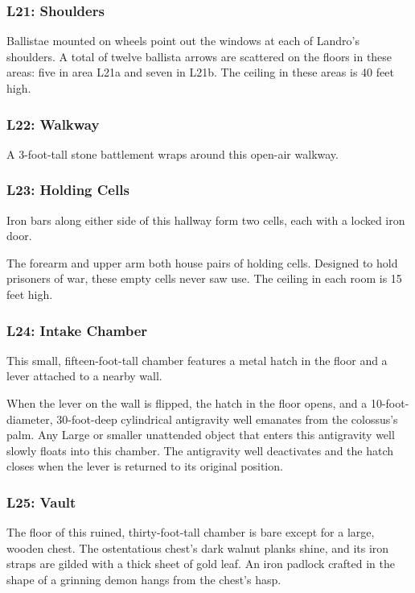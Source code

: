 \documentclass[10pt,a4paper,twoside,bg=print,twocolumn,openany,nodeprecatedcode]{dndbook}
\begin{document}
\subsubsection{L21: Shoulders}
Ballistae mounted on wheels point out the windows at each of Landro's shoulders. A total of twelve ballista arrows are scattered on the floors in these areas: five in area L21a and seven in L21b. The ceiling in these areas is 40 feet high.

\subsubsection{L22: Walkway}
A 3-foot-tall stone battlement wraps around this open-air walkway.

\subsubsection{L23: Holding Cells}
\begin{DndReadAloud}{}
Iron bars along either side of this hallway form two cells, each with a locked iron door.

\end{DndReadAloud}

The forearm and upper arm both house pairs of holding cells. Designed to hold prisoners of war, these empty cells never saw use. The ceiling in each room is 15 feet high.

\subsubsection{L24: Intake Chamber}
\begin{DndReadAloud}{}
This small, fifteen-foot-tall chamber features a metal hatch in the floor and a lever attached to a nearby wall.

\end{DndReadAloud}

When the lever on the wall is flipped, the hatch in the floor opens, and a 10-foot-diameter, 30-foot-deep cylindrical antigravity well emanates from the colossus's palm. Any Large or smaller unattended object that enters this antigravity well slowly floats into this chamber. The antigravity well deactivates and the hatch closes when the lever is returned to its original position.

\subsubsection{L25: Vault}
\begin{DndReadAloud}{}
The floor of this ruined, thirty-foot-tall chamber is bare except for a large, wooden chest. The ostentatious chest's dark walnut planks shine, and its iron straps are gilded with a thick sheet of gold leaf. An iron padlock crafted in the shape of a grinning demon hangs from the chest's hasp.

\end{DndReadAloud}
\end{document}
